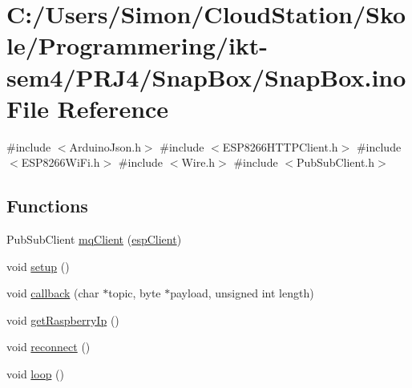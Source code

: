 \hypertarget{_snap_box_8ino}{}\section{C\+:/\+Users/\+Simon/\+Cloud\+Station/\+Skole/\+Programmering/ikt-\/sem4/\+P\+R\+J4/\+Snap\+Box/\+Snap\+Box.ino File Reference}
\label{_snap_box_8ino}
{\ttfamily \#include $<$Arduino\+Json.\+h$>$}\newline
{\ttfamily \#include $<$E\+S\+P8266\+H\+T\+T\+P\+Client.\+h$>$}\newline
{\ttfamily \#include $<$E\+S\+P8266\+Wi\+Fi.\+h$>$}\newline
{\ttfamily \#include $<$Wire.\+h$>$}\newline
{\ttfamily \#include $<$Pub\+Sub\+Client.\+h$>$}\newline
\subsection*{Functions}
\begin{DoxyCompactItemize}
\item 
Pub\+Sub\+Client \mbox{\hyperlink{_snap_box_8ino_a3723ecd4627fe1acd7f94dd266f1105a}{mq\+Client}} (\mbox{\hyperlink{_snap_box_8ino_abd77e757e4b3bb6f1e4b42b21ea9e040}{esp\+Client}})
\item 
void \mbox{\hyperlink{_snap_box_8ino_a4fc01d736fe50cf5b977f755b675f11d}{setup}} ()
\item 
void \mbox{\hyperlink{_snap_box_8ino_ac3a129f66dc859e2b7279565f4e1de78}{callback}} (char $\ast$topic, byte $\ast$payload, unsigned int length)
\item 
void \mbox{\hyperlink{_snap_box_8ino_a7a69432900bad935bd00eb0a9d4bf61f}{get\+Raspberry\+Ip}} ()
\item 
void \mbox{\hyperlink{_snap_box_8ino_a4bcd6ce7d04c38f8c4ff908d1fc50f86}{reconnect}} ()
\item 
void \mbox{\hyperlink{_snap_box_8ino_afe461d27b9c48d5921c00d521181f12f}{loop}} ()
\end{DoxyCompactItemize}
